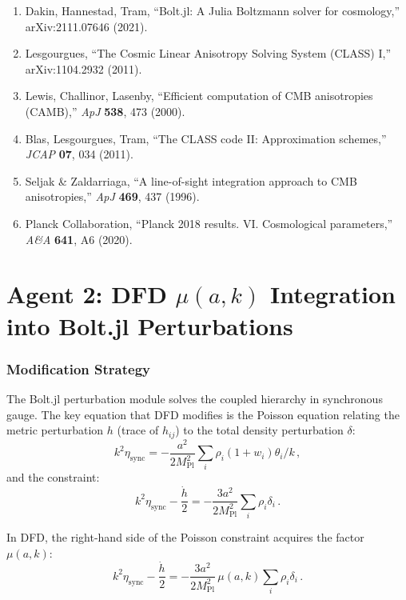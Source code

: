 \documentclass[11pt,a4paper]{article}
\begin{document}
\begin{enumerate}
\item Dakin, Hannestad, Tram, ``Bolt.jl: A Julia Boltzmann solver for cosmology,'' arXiv:2111.07646 (2021).
\item Lesgourgues, ``The Cosmic Linear Anisotropy Solving System (CLASS) I,'' arXiv:1104.2932 (2011).
\item Lewis, Challinor, Lasenby, ``Efficient computation of CMB anisotropies (CAMB),'' \textit{ApJ} \textbf{538}, 473 (2000).
\item Blas, Lesgourgues, Tram, ``The CLASS code II: Approximation schemes,'' \textit{JCAP} \textbf{07}, 034 (2011).
\item Seljak \& Zaldarriaga, ``A line-of-sight integration approach to CMB anisotropies,'' \textit{ApJ} \textbf{469}, 437 (1996).
\item Planck Collaboration, ``Planck 2018 results. VI. Cosmological parameters,'' \textit{A\&A} \textbf{641}, A6 (2020).
\end{enumerate}


\part{Agent 2: DFD $\mu(a,k)$ Integration into Bolt.jl Perturbations}
\label{part:mu-integration}

\section{Modification Strategy}

The Bolt.jl perturbation module solves the coupled hierarchy in synchronous gauge. The key equation that DFD modifies is the Poisson equation relating the metric perturbation $h$ (trace of $h_{ij}$) to the total density perturbation $\delta$:
\begin{equation}
k^2\eta_{\mathrm{sync}} = -\frac{a^2}{2M_{\mathrm{Pl}}^2}\sum_i \rho_i(1 + w_i)\theta_i / k\,,
\end{equation}
and the constraint:
\begin{equation}
k^2\eta_{\mathrm{sync}} - \frac{\dot{h}}{2} = -\frac{3a^2}{2M_{\mathrm{Pl}}^2}\sum_i \rho_i\delta_i\,.
\end{equation}

In DFD, the right-hand side of the Poisson constraint acquires the factor $\mu(a,k)$:
\begin{equation}
k^2\eta_{\mathrm{sync}} - \frac{\dot{h}}{2} = -\frac{3a^2}{2M_{\mathrm{Pl}}^2}\,\mu(a,k)\sum_i \rho_i\delta_i\,.
\end{equation}
\end{document}
